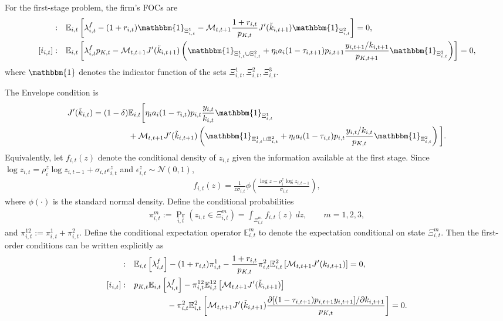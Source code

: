 \documentclass[12pt]{article}
\numberwithin{equation}{section}
\begin{document}
For the first-stage problem, the firm's FOCs are
\begin{align*}
    [b^f_{i,t}]: \quad &\mathbb{E}_{i,t}\left[\lambda^{f}_{i,t} - (1+r_{i,t})\mathbbm{1}_{\Xi^1_{i,t}} - \mathcal{M}_{t,t+1} \frac{1+r_{i,t}}{p_{K,t}} J'(\tilde{k}_{i,t+1})\mathbbm{1}_{\Xi^2_{i,t}} \right] = 0, \\
    [i_{i,t}]: \quad &\mathbb{E}_{i,t}\left[\lambda^{f}_{i,t}p_{K,t} - \mathcal{M}_{t,t+1} J'(\tilde{k}_{i, t+1})\left(\mathbbm{1}_{\Xi^1_{i,t} \cup \Xi^2_{i,t}} + \eta_i a_i(1-\tau_{i,t+1})p_{i,t+1}\frac{y_{i,t+1}/k_{i,t+1}}{p_{K,t+1}}\mathbbm{1}_{\Xi^2_{i,t}}\right)\right] = 0,
\end{align*}
where $\mathbbm{1}$ denotes the indicator function of the sets $\Xi^1_{i,t}, \Xi^2_{i,t}, \Xi^3_{i,t}$. 

The Envelope condition is
\begin{align*}
    J'(\tilde{k}_{i,t}) = (1-\delta) &\mathbb{E}_{i,t}\bigg[\eta_i a_i (1-\tau_{i,t})p_{i,t}\frac{y_{i,t}}{k_{i,t}}\mathbbm{1}_{\Xi^1_{i,t}} \\
    &+ \mathcal{M}_{t,t+1} J'(\tilde{k}_{i, t+1})\left(\mathbbm{1}_{\Xi^1_{i,t} \cup \Xi^2_{i,t}} + \eta_i a_i(1-\tau_{i,t})p_{i,t}\frac{y_{i,t}/k_{i,t}}{p_{K,t}}\mathbbm{1}_{\Xi^2_{i,t}}\right)\bigg].
\end{align*}
Equivalently, let $f_{i,t}(z)$ denote the conditional density of $z_{i,t}$ given the information available at the first stage. Since $\log z_{i,t}=\rho_i^z\log z_{i,t-1}+\sigma_{i,t}\epsilon^z_{i,t}$ and $\epsilon^z_{i,t}\sim\mathcal N(0,1)$,
\begin{align*}
    f_{i,t}(z)
    =
    \frac{1}{z\sigma_{i,t}}
    \phi\left(
        \frac{\log z-\rho_i^z\log z_{i,t-1}}{\sigma_{i,t}}
    \right),
\end{align*}
where $\phi(\cdot)$ is the standard normal density. Define the conditional probabilities
\begin{align*}
    \pi^m_{i,t}
    :=
    \Pr_{i,t}\left(z_{i,t}\in\Xi^m_{i,t}\right)
    =
    \int_{\Xi^m_{i,t}} f_{i,t}(z)\,dz,
    \qquad
    m=1,2,3,
\end{align*}
and $\pi^{12}_{i,t}:=\pi^1_{i,t}+\pi^2_{i,t}$. Define the conditional expectation operator $\mathbb{E}^m_{i,t}$ to denote the expectation conditional on state $\Xi^m_{i,t}$. Then the first-order conditions can be written explicitly as
\begin{align}
    [b^f_{i,t}]: \quad
    &\mathbb{E}_{i,t}\left[\lambda^f_{i,t}\right]
    -
    (1+r_{i,t})\pi^1_{i,t}
    -
    \frac{1+r_{i,t}}{p_{K,t}}
    \pi^2_{i,t}
    \mathbb{E}^{2}_{i,t}\left[
        \mathcal M_{t,t+1}
        J'(k_{i,t+1})
    \right]
    =
    0, \label{eq:first_stage_foc_b}
    \\
    [i_{i,t}]: \quad
    &p_{K,t}\mathbb{E}_{i,t}\left[\lambda^f_{i,t}\right]
    -
    \pi^{12}_{i,t}
    \mathbb{E}^{12}_{i,t}\left[
        \mathcal M_{t,t+1}
        J'(\tilde{k}_{i,t+1})
    \right]\notag \\
    &\qquad \qquad -
    \pi^{2}_{i,t}
    \mathbb{E}^2_{i,t} \left[
        \mathcal{M}_{t,t+1}J'(\tilde{k}_{i,t+1})
        \frac{\partial [(1-\tau_{i,t+1})p_{i,t+1} y_{i,t+1}]/\partial k_{i,t+1}
        }{
            p_{K,t}
        }
    \right] = 0. \label{eq:first_stage_foc_i}
\end{align}
\end{document}
